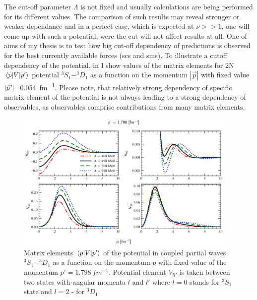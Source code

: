 The cut-off parameter $\Lambda$ is not fixed and usually calculations
are being performed for its different values. The comparison
of such results may reveal stronger or weaker dependance and in a perfect
case, which is expected at $\nu >> 1$, one will come up with such a potential, were the cut will
not affect results at all. One of aims of my thesis is to test how big cut-off dependency
of predictions is
observed for the best currently available forces (\gls{scs} and \gls{sms}). 
To illustrate a cutoff dependency of the potential, in  
I show values of the matrix elements for 2N $\matrixel{p}{V}{p^\prime}$ potential $^3S_1-^3D_1$
as a function on the momentum $|\vec{p}|$ with fixed value $|\pvec{p}|$=\SI{0.054}{fm^{-1}}.
Please note, that relatively strong dependency of specific matrix element of the potential
is not always leading to a strong dependency of observables, as 
observables comprise contributions from many matrix elements.



\begin{figure}[htb]
    \begin{center}
    \includegraphics[width=0.95\textwidth]{PlotData/Deuteron/WAVEFUNC/potential_pp1.798.pdf}
    \end{center}
    \caption{Matrix elements $\matrixel{p}{V}{p^\prime}$ of the potential in
    coupled partial waves $^3S_1 - ^3D_1$ as a function on the momentum $p$ with fixed
    value of the momentum $p'=\SI{1.798}{fm^{-1}}$. Potential element $V_{ll'}$
    is taken between two states with angular momenta  $l$ and $l'$ where $l=0$
    stands  for $^3S_1$ state and $l=2$ - for $^3D_1$. 
    }
    \label{potential_cutoff}
\end{figure}



